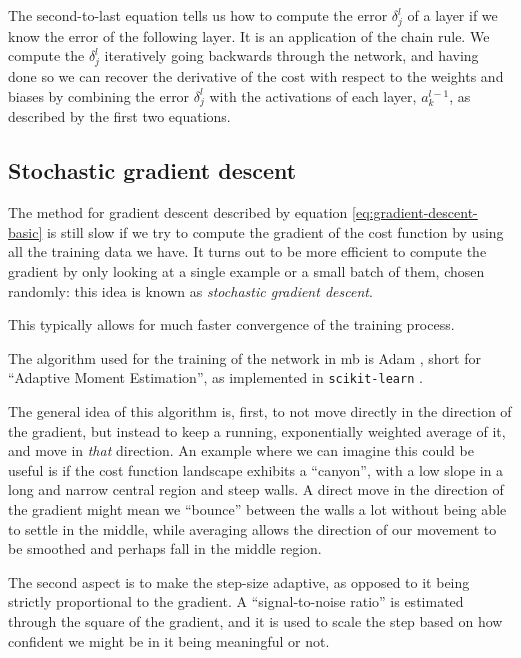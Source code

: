 \documentclass[main.tex]{subfiles}
\begin{document}
The second-to-last equation tells us how to compute the error \(\delta^{l}_{j}\) of a layer if we know the error of the following layer. 
It is an application of the chain rule. 
We compute the \(\delta^{l}_{j}\) iteratively going backwards through the network, and having done so we can recover the derivative of the cost with respect to the weights and biases by combining the error \(\delta^{l}_{j}\) with the activations of each layer, \(a^{l-1}_{k}\), as described by the first two equations. 

\subsection{Stochastic gradient descent} \label{sec:sgd}

The method for gradient descent described by equation \ref{eq:gradient-descent-basic} is still slow if we try to compute the gradient of the cost function by using all the training data we have. 
It turns out to be more efficient to compute the gradient by only looking at a single example or a small batch of them, chosen randomly: this idea is known as \emph{stochastic gradient descent}. 

This typically allows for much faster convergence of the training process.

The algorithm used for the training of the network in \acs{mb} is Adam \cite{kingmaAdamMethodStochastic2017,ruderOverviewGradientDescent2016}, short for ``Adaptive Moment Estimation'', as implemented in \texttt{scikit-learn} \cite[]{pedregosaScikitlearnMachineLearning2011}. 

The general idea of this algorithm is, first, to not move directly in the direction of the gradient, but instead to keep a running, exponentially weighted average of it, and move in \emph{that} direction. 
An example where we can imagine this could be useful is if the cost function landscape exhibits a ``canyon'', with a low slope in a long and narrow central region and steep walls. 
A direct move in the direction of the gradient might mean we ``bounce'' between the walls a lot without being able to settle in the middle, while averaging allows the direction of our movement to be smoothed and perhaps fall in the middle region. 

The second aspect is to make the step-size adaptive, as opposed to it being strictly proportional to the gradient.
A ``signal-to-noise ratio'' is estimated through the square of the gradient, and it is used to scale the step based on how confident we might be in it being meaningful or not. 
\end{document}
